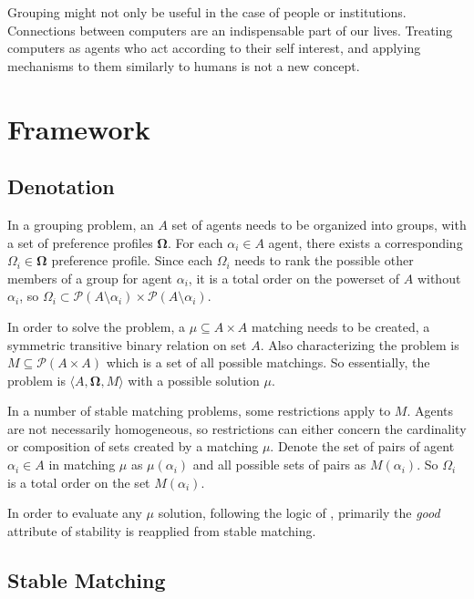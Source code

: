 \documentclass{elsarticle}
\begin{document}
Grouping might not only be useful in the case of people or institutions. Connections between computers are an indispensable part of our lives. Treating computers as agents who act according to their self interest, and applying mechanisms to them similarly to humans is not a new concept. \citep{nisan99}

\section{Framework}

\subsection{Denotation}

In a grouping problem, an $A$ set of agents needs to be organized into groups, with a set of preference profiles $\mathbf{\Omega}$. For each $\alpha_i \in A$ agent, there exists a corresponding $\Omega_i \in \mathbf{\Omega}$ preference profile. Since each $\Omega_i$ needs to rank the possible other members of a group for agent $\alpha_i$, it is a total order on the powerset of $A$ without $\alpha_i$, so $\Omega_i \subset \mathcal{P}(A\setminus \alpha_i) \times \mathcal{P}(A\setminus \alpha_i)$.

In order to solve the problem, a $\mu \subseteq A \times A$ matching needs to be created, a symmetric transitive binary relation on set $A$. Also characterizing the problem is $M \subseteq \mathcal{P}(A \times A)$ which is a set of all possible matchings. So essentially, the problem is $\langle A, \mathbf{\Omega}, M \rangle$ with a possible solution $\mu$.

In a number of stable matching problems, some restrictions apply to $M$. Agents are not necessarily homogeneous, so restrictions can either concern the cardinality or composition of sets created by a matching $\mu$. Denote the set of pairs of agent $\alpha_i \in A$ in matching $\mu$ as $\mu(\alpha_i)$ and all possible sets of pairs as $M(\alpha_i)$. So $\Omega_i$ is a total order on the set $M(\alpha_i)$.

In order to evaluate any $\mu$ solution, following the logic of \cite{budish12}, primarily the \textit{good} attribute of stability is reapplied from stable matching.

\subsection{Stable Matching}
\end{document}
